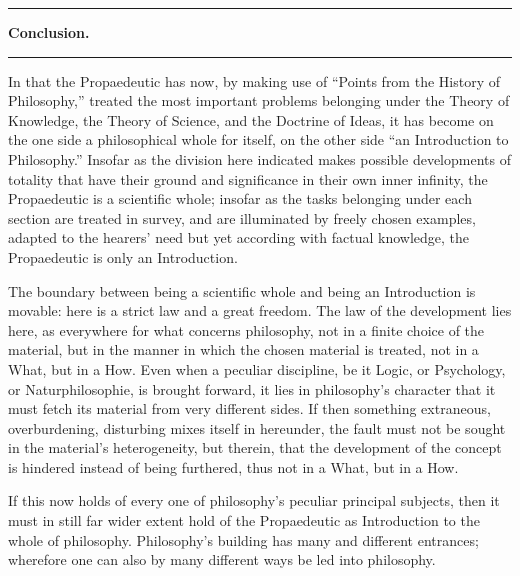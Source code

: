 \documentclass[12pt]{book}
\begin{document}
\begin{center}\rule{0.35\linewidth}{0.4pt}\end{center}
\begin{center}
  {\Large\bfseries Conclusion.}\par\vspace{4pt}
  \rule{2.5cm}{0.4pt}
\end{center}
{}

In that the Propaedeutic has now, by making use of ``Points from the History of Philosophy,'' treated the
most important problems belonging under the Theory of Knowledge, the Theory of Science, and the Doctrine of
Ideas, it has become on the one side a philosophical whole for itself, on the other side ``an Introduction
to Philosophy.'' Insofar as the division here indicated makes possible developments of totality that have
their ground and significance in their own inner infinity, the Propaedeutic is a scientific whole; insofar
as the tasks belonging under each section are treated in survey, and are illuminated by freely chosen
examples, adapted to the hearers' need but yet according with factual knowledge, the Propaedeutic is only
an Introduction.

The boundary between being a scientific whole and being an Introduction is movable: here is a strict law and
a great freedom. The law of the development lies here, as everywhere for what concerns philosophy, not in a
finite choice of the material, but in the manner in which the chosen material is treated, not in a What, but
in a How. Even when a peculiar discipline, be it Logic, or Psychology, or Naturphilosophie, is brought
forward, it lies in philosophy's character that it must fetch its material from very different sides. If
then something extraneous, overburdening, disturbing mixes itself in hereunder, the fault must not be sought
in the material's heterogeneity, but therein, that the development of the concept is hindered
instead of being furthered, thus not in a What, but in a How.

If this now holds of every one of philosophy's peculiar principal subjects, then it must in still far wider
extent hold of the Propaedeutic as Introduction to the whole of philosophy. Philosophy's building has many
and different entrances; wherefore one can also by many different ways be led into philosophy.
\end{document}
